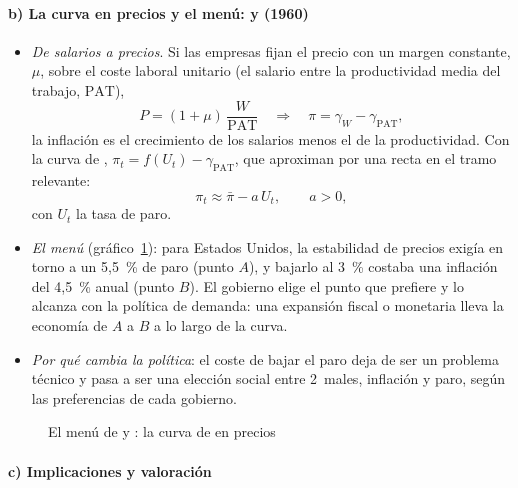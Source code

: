 \documentclass[11pt]{article}
\begin{document}
\paragraph{b) La curva en precios y el menú:  y  (1960)}

\begin{itemize}
\item \emph{De salarios a precios}. Si las empresas fijan el precio con un margen constante, $\mu$, sobre el coste laboral unitario (el salario entre la productividad media del trabajo, $\mathrm{PAT}$),
  \begin{equation*}
  P=(1+\mu)\,\frac{W}{\mathrm{PAT}}\quad\Longrightarrow\quad\pi=\gamma_W-\gamma_{\mathrm{PAT}},
  \end{equation*}
  la inflación es el crecimiento de los salarios menos el de la productividad. Con la curva de , $\pi_t=f(U_t)-\gamma_{\mathrm{PAT}}$, que \textcite{SamuelsonSolow1960Analytical} aproximan por una recta en el tramo relevante:
    \begin{equation}
    \pi_t\approx\bar\pi-a\,U_t,\qquad a>0, \label{eq:samuelson-solow}
    \end{equation}
    con $U_t$ la tasa de paro.
\item \emph{El menú} (gráfico~\ref{fig:samuelson-solow}): para Estados Unidos, la estabilidad de precios exigía en torno a un 5,5~\% de paro (punto $A$), y bajarlo al 3~\% costaba una inflación del 4,5~\% anual (punto $B$). El gobierno elige el punto que prefiere y lo alcanza con la política de demanda: una expansión fiscal o monetaria lleva la economía de $A$ a $B$ a lo largo de la curva.
\item \emph{Por qué cambia la política}: el coste de bajar el paro deja de ser un problema técnico y pasa a ser una elección social entre 2~males, inflación y paro, según las preferencias de cada gobierno.
\end{itemize}

\begin{figure}[H]
\centering
\caption{El menú de  y : la curva de  en precios}\label{fig:samuelson-solow}
\end{figure}

\paragraph{c) Implicaciones y valoración}
\end{document}
